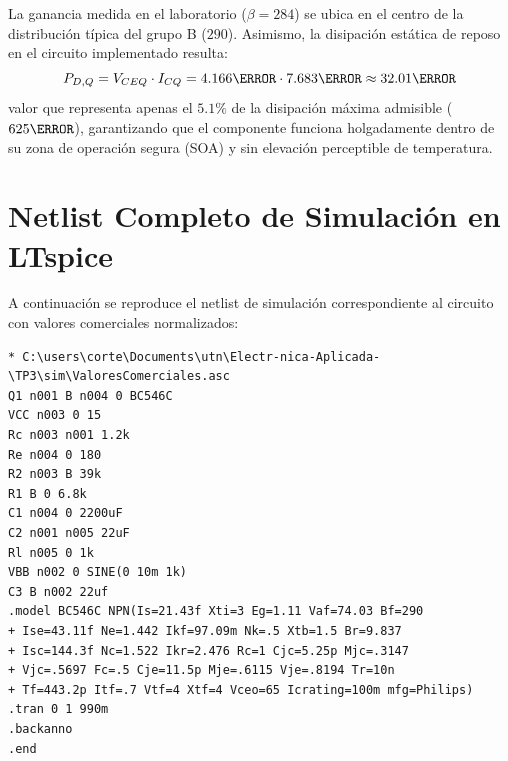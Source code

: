\begin{table}[!ht]
  \centering
  \caption{Características eléctricas típicas del grupo de ganancia B del transistor BC546.}
  \label{tab:datasheet_caract}
\end{table}

La ganancia medida en el laboratorio ($\beta = 284$) se ubica en el centro de la distribución típica del grupo B ($290$).
Asimismo, la disipación estática de reposo en el circuito implementado resulta:
\begin{equation}
  P_{D,Q} = V_{CEQ} \cdot I_{CQ} = 4.166\V \cdot 7.683\mA \approx 32.01\mW
\end{equation}
valor que representa apenas el $5.1\%$ de la disipación máxima admisible ($625\mW$), garantizando que el componente
funciona holgadamente dentro de su zona de operación segura (SOA) y sin elevación perceptible de temperatura.

\section{Netlist Completo de Simulación en LTspice}

A continuación se reproduce el netlist de simulación correspondiente al circuito con valores comerciales normalizados:

\begin{lstlisting}[style=ltspice, caption={Netlist de simulación para el circuito con valores comerciales en LTspice.}, label={list:netlist_comercial}]
* C:\users\corte\Documents\utn\Electr-nica-Aplicada-\TP3\sim\ValoresComerciales.asc
Q1 n001 B n004 0 BC546C
VCC n003 0 15
Rc n003 n001 1.2k
Re n004 0 180
R2 n003 B 39k
R1 B 0 6.8k
C1 n004 0 2200uF
C2 n001 n005 22uF
Rl n005 0 1k
VBB n002 0 SINE(0 10m 1k)
C3 B n002 22uf
.model BC546C NPN(Is=21.43f Xti=3 Eg=1.11 Vaf=74.03 Bf=290
+ Ise=43.11f Ne=1.442 Ikf=97.09m Nk=.5 Xtb=1.5 Br=9.837
+ Isc=144.3f Nc=1.522 Ikr=2.476 Rc=1 Cjc=5.25p Mjc=.3147
+ Vjc=.5697 Fc=.5 Cje=11.5p Mje=.6115 Vje=.8194 Tr=10n
+ Tf=443.2p Itf=.7 Vtf=4 Xtf=4 Vceo=65 Icrating=100m mfg=Philips)
.tran 0 1 990m
.backanno
.end
\end{lstlisting}

